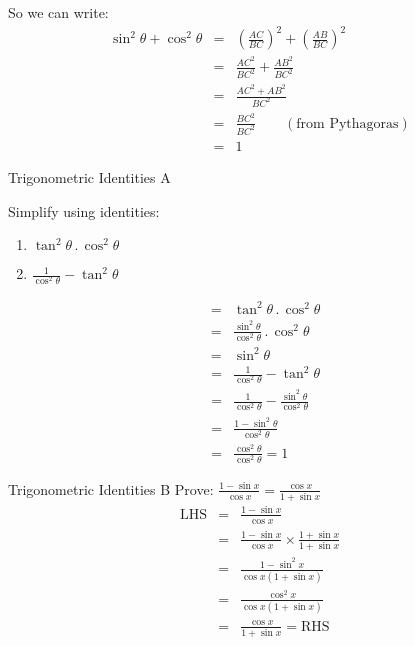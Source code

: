 So we can write:
\begin{eqnarray*}
\sin^2 \theta + \cos^2 \theta &=&\left(\frac{AC}{BC}\right)^2 + \left(\frac{AB}{BC}\right)^2\\
&=&\frac{AC^2}{BC^2} + \frac{AB^2}{BC^2}\\
&=&\frac{AC^2+AB^2}{BC^2}\\
&=&\frac{BC^2}{BC^2}\quad\quad(\mbox{from Pythagoras})\\
&=&1
\end{eqnarray*}
\clearpage
\begin{wex}{Trigonometric Identities A}
{
Simplify using identities:
\begin{enumerate}
\item $\tan^2\theta \,.\, \cos^2\theta$
\item $\frac{1}{\cos^2\theta} - \tan^2\theta$
\end{enumerate}
}
{
\begin{eqnarray*}
&=& \tan^2\theta \,.\, \cos^2\theta \\
&=& \frac{\sin^2\theta}{\cos^2\theta}\,.\,\cos^2\theta \\
&=& \sin^2\theta 
\end{eqnarray*}
\begin{eqnarray*}
&=&  \frac{1}{\cos^2\theta} - \tan^2\theta \\
&=& \frac{1}{\cos^2\theta} -\frac{\sin^2\theta}{\cos^2\theta} \\
&=& \frac{1-\sin^2\theta}{\cos^2\theta} \\
&=& \frac{\cos^2\theta}{\cos^2\theta} = 1 
\end{eqnarray*}
}
\end{wex}

\begin{wex}{Trigonometric Identities B}
{
Prove: $\frac{1-\sin x}{\cos x} = \frac{\cos x}{1+\sin x}$\nopagebreak[1]
}%
{%
\begin{eqnarray*}
\mbox{LHS} &= & \frac{1-\sin x}{\cos x} \\
 &=& \frac{1-\sin x}{\cos x} \times  \frac{1+\sin x}{1+\sin x}\\
 &=& \frac{1-\sin^2x}{\cos x(1+\sin x)}\\
 &=& \frac{\cos^2x}{\cos x(1+\sin x)} \\
 &=& \frac{\cos x}{1+\sin x} = \mbox{RHS}
\end{eqnarray*}
}%
\end{wex}

